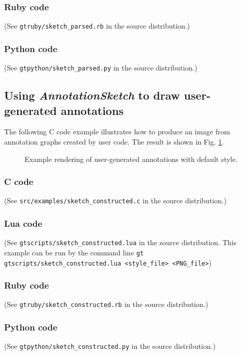 \documentclass[a4paper]{scrreprt}
\begin{document}
\subsubsection{Ruby code}
(See \texttt{gtruby/sketch\_parsed.rb} in the source distribution.)

\subsubsection{Python code}
(See \texttt{gtpython/sketch\_parsed.py} in the source distribution.)


\subsection{Using \emph{AnnotationSketch} to draw user-generated annotations}
The following C code example illustrates how to produce an image from annotation graphs created by user code.
 The result is shown in Fig. \ref{constructed_img}.

\begin{figure}
\caption{Example rendering of user-generated annotations with default style.}
\label{constructed_img}
\end{figure}

\subsubsection{C code}
(See \texttt{src/examples/sketch\_constructed.c} in the source distribution.)

\subsubsection{Lua code}
(See \texttt{gtscripts/sketch\_constructed.lua} in the source distribution.  This example can be run by the command line \texttt{gt gtscripts/sketch\_constructed.lua <style\_file> <PNG\_file>})

\subsubsection{Ruby code}
(See \texttt{gtruby/sketch\_constructed.rb} in the source distribution.)

\subsubsection{Python code}
(See \texttt{gtpython/sketch\_constructed.py} in the source distribution.)



%
\end{document}
